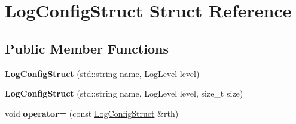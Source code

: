 \hypertarget{structLogConfigStruct}{}\section{Log\+Config\+Struct Struct Reference}
\label{structLogConfigStruct}
\subsection*{Public Member Functions}
\begin{DoxyCompactItemize}
\item 
\mbox{\label{structLogConfigStruct_a74dce76394bd0f1484f98e8bae28d737}} 
{\bfseries Log\+Config\+Struct} (std\+::string name, Log\+Level level)
\item 
\mbox{\label{structLogConfigStruct_a8a76737e082e33ae6cabaaf7a17d89c4}} 
{\bfseries Log\+Config\+Struct} (std\+::string name, Log\+Level level, size\+\_\+t size)
\item 
\mbox{\label{structLogConfigStruct_adc78fb5a41a61f7361ed1323735483c3}} 
void {\bfseries operator=} (const \hyperlink{structLogConfigStruct}{Log\+Config\+Struct} \&rth)
\end{DoxyCompactItemize}
